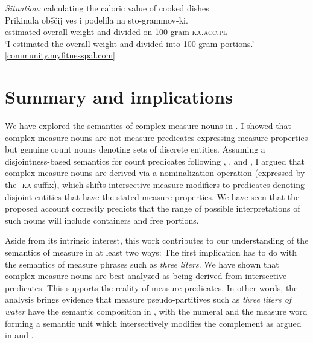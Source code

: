 \documentclass[output=paper,
colorlinks,
citecolor=brown,
newtxmath
]{langscibook}
\begin{document}
\ea\label{ex:khrizmann:40} \textit{Situation:} calculating the caloric value of cooked dishes\\
\gll Prikinula obščij ves i podelila na sto-grammov-ki.\\
estimated overall weight and divided on 100-gram-\textsc{ka.acc.pl}\\
\glt `I estimated the overall weight and divided into 100-gram portions.'\\
\glt \hfill [\href{https://community.myfitnesspal.com/ru/discussion/1469795/pomogite-s-podschetami-kaloriynosti-gotovogo-blyuda}{community.myfitnesspal.com}]
\z

%
%

\section{Summary and implications}\label{sec:6}

We have explored the semantics of complex measure nouns in . I showed that complex measure nouns are not measure predicates expressing measure properties but genuine count nouns denoting sets of discrete entities. Assuming a disjointness-based semantics for count predicates following \citet{Rothstein2010,Rothstein2011}, \citet{Rothstein2017}, and \citet{Landman2011,Landman2016}, I argued that complex measure nouns are derived via a nominalization operation (expressed by the -\textsc{ka} suffix), which shifts intersective measure modifiers to predicates denoting disjoint entities that have the stated measure properties. We have seen that the proposed account correctly predicts that the range of possible interpretations of such nouns will include containers and free portions.

Aside from its intrinsic interest, this work contributes to our understanding of the semantics of measure in at least two ways: The first implication has to do with the semantics of measure phrases such as \textit{three liters}. We have shown that complex measure nouns are best analyzed as being derived from intersective predicates. This supports the reality of measure predicates. In other words, the analysis brings evidence that measure pseudo-partitives such as \textit{three liters of water} have the semantic composition in , with the numeral and the measure word forming a semantic unit which intersectively modifies the complement as argued in \citet{Rothstein2009,Rothstein2011,Rothstein2017} and \citet{Landman2004,Landman2016}.
\end{document}
